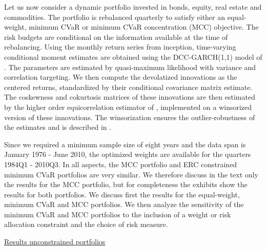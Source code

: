 \documentclass[12pt,a4paper]{article}
\begin{document}
Let us now consider a dynamic portfolio invested in bonds, equity, real estate and commodities. The portfolio is rebalanced quarterly to satisfy either an equal-weight, minimum CVaR or minimum CVaR concentration (MCC) objective. The risk budgets are conditional on the information available at the time of rebalancing. Using the monthly return series from inception, time-varying conditional moment estimates are obtained using the DCC-GARCH(1,1) model of \citet{EngleDCC02}.  The parameters are estimated by quasi-maximum likelihood with variance and correlation targeting.  We then compute the devolatized innovations as the centered returns, standardized by their conditional covariance matrix estimate.  The coskewness and cokurtosis matrices of these innovations are then estimated by the higher order equicorrelation estimator of \citet{MartelliniZiemann2010}, implemented on a winsorized version of these innovations. The winsorization ensures the outlier-robustness of the estimates and is described in \citet{Boudt2007}.

Since we required a minimum sample size of eight years and the data span is January 1976 - June 2010, the optimized weights are available for the quarters 1984Q1 - 2010Q3.  In all aspects, the MCC portfolio and ERC constrained minimum CVaR portfolios are very similar. We therefore discuss in the text only the results for the MCC portfolio, but for completeness the exhibits show the results for both portfolios.
We discuss first the results for the equal-weight, minimum CVaR and MCC portfolios. We then analyze the sensitivity of the minimum CVaR and MCC portfolios to the inclusion of a weight or risk allocation constraint and the choice of risk measure. 


\underline{Results unconstrained portfolios}
\end{document}
